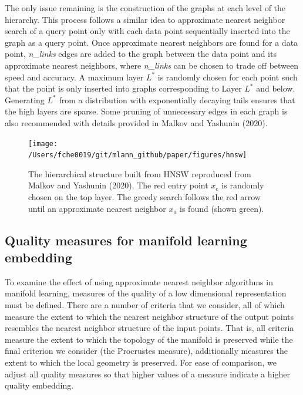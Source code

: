 \documentclass[12pt]{article}
\begin{document}
The only issue remaining is the construction of the graphs at each level of the hierarchy. This process follows a similar idea to approximate nearest neighbor search of a query point only with each data point sequentially inserted into the graph as a query point. Once approximate nearest neighbors are found for a data point, \textit{n\_links} edges are added to the graph between the data point and its approximate nearest neighbors, where \textit{n\_links} can be chosen to trade off between speed and accuracy. A maximum layer \(L^*\) is randomly chosen for each point such that the point is only inserted into graphs corresponding to Layer \(L^*\) and below. Generating \(L^*\) from a distribution with exponentially decaying tails ensures that the high layers are sparse. Some pruning of unnecessary edges in each graph is also recommended with details provided in Malkov and Yashunin (2020).



\begin{figure}

{\centering \texttt{[image: /Users/fche0019/git/mlann\_github/paper/figures/hnsw]} 

}

\caption{The hierarchical structure built from HNSW reproduced from Malkov and Yashunin (2020). The red entry point \(x_e\) is randomly chosen on the top layer. The greedy search follows the red arrow until an approximate nearest neighbor \(x_a\) is found (shown green).}\label{fig:hnsw}
\end{figure}

\hypertarget{qualitymeasure}{%
\subsection{Quality measures for manifold learning embedding}\label{qualitymeasure}}

To examine the effect of using approximate nearest neighbor algorithms in manifold learning, measures of the quality of a low dimensional representation must be defined. There are a number of criteria that we consider, all of which measure the extent to which the nearest neighbor structure of the output points resembles the nearest neighbor structure of the input points. That is, all criteria measure the extent to which the topology of the manifold is preserved while the final criterion we consider (the Procrustes measure), additionally measures the extent to which the local geometry is preserved. For ease of comparison, we adjust all quality measures so that higher values of a measure indicate a higher quality embedding.
\end{document}
